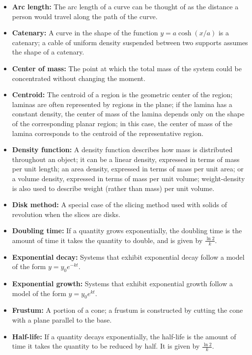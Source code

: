 \documentclass{report}
\begin{document}
\begin{itemize}
         \item \textbf{Arc length:} The arc length of a curve can be thought of as the distance a person would travel along the path of the curve.
        \item \textbf{Catenary:} A curve in the shape of the function \(y = a \cosh(x/a)\) is a catenary; a cable of uniform density suspended between two supports assumes the shape of a catenary.
        \item \textbf{Center of mass:} The point at which the total mass of the system could be concentrated without changing the moment.
        \item \textbf{Centroid:} The centroid of a region is the geometric center of the region; laminas are often represented by regions in the plane; if the lamina has a constant density, the center of mass of the lamina depends only on the shape of the corresponding planar region; in this case, the center of mass of the lamina corresponds to the centroid of the representative region.
        \item \textbf{Density function:} A density function describes how mass is distributed throughout an object; it can be a linear density, expressed in terms of mass per unit length; an area density, expressed in terms of mass per unit area; or a volume density, expressed in terms of mass per unit volume; weight-density is also used to describe weight (rather than mass) per unit volume.
        \item \textbf{Disk method:} A special case of the slicing method used with solids of revolution when the slices are disks.
        \item \textbf{Doubling time:} If a quantity grows exponentially, the doubling time is the amount of time it takes the quantity to double, and is given by \(\frac{\ln 2}{k}\).
        \item \textbf{Exponential decay:} Systems that exhibit exponential decay follow a model of the form \(y = y_0 e^{-kt}\).
        \item \textbf{Exponential growth:} Systems that exhibit exponential growth follow a model of the form \(y = y_0 e^{kt}\).
        \item \textbf{Frustum:} A portion of a cone; a frustum is constructed by cutting the cone with a plane parallel to the base.
        \item \textbf{Half-life:} If a quantity decays exponentially, the half-life is the amount of time it takes the quantity to be reduced by half. It is given by \(\frac{\ln 2}{k}\).

\end{itemize}
\end{document}
